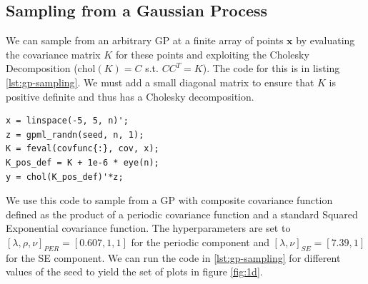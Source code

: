 \documentclass[]{article}
\begin{document}
\subsection{Sampling from a Gaussian Process}

We can sample from an arbitrary GP at a finite array of points $\mathbf{x}$ by evaluating the covariance matrix $K$ for these points and exploiting the Cholesky Decomposition ($\text{chol}(K) = C$ s.t. $C C^T = K$). The code for this is in listing \ref{lst:gp-sampling}. We must add a small diagonal matrix to ensure that $K$ is positive definite and thus has a Cholesky decomposition.

\begin{lstlisting}[frame=single, caption={GP sampling}, label={lst:gp-sampling}]
x = linspace(-5, 5, n)';
z = gpml_randn(seed, n, 1);
K = feval(covfunc{:}, cov, x);
K_pos_def = K + 1e-6 * eye(n);
y = chol(K_pos_def)'*z;
\end{lstlisting}

We use this code to sample from a GP with composite covariance function defined as the product of a periodic covariance function and a standard Squared Exponential covariance function. The hyperparameters are set to $[\lambda, \rho, \nu]_{PER} = [0.607, 1, 1]$ for the periodic component and $[\lambda, \nu]_{SE} = [7.39, 1]$ for the SE component. We can run the code in \ref{lst:gp-sampling} for different values of the seed to yield the set of plots in figure \ref{fig:1d}.
\end{document}
